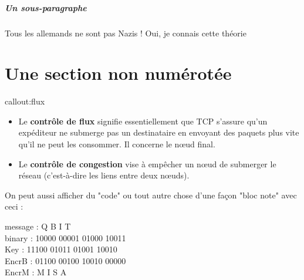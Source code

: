 \subparagraph{Un sous-paragraphe}

\begin{dialogue}
      Tous les allemands ne sont pas Nazis !
     Oui, je connais cette théorie
\end{dialogue}

\section*{Une section non numérotée}

\begin{callout}{callout:flux}
    \begin{itemize}
        \item Le \textbf{contrôle de flux} signifie essentiellement que TCP s'assure qu'un expéditeur ne submerge pas un destinataire en envoyant des paquets plus vite qu'il ne peut les consommer. Il concerne le nœud final.
        \item Le \textbf{contrôle de congestion} vise à empêcher un nœud de submerger le réseau (c'est-à-dire les liens entre deux nœuds).
    \end{itemize}
\end{callout}

On peut aussi afficher du "code" ou tout autre chose d'une façon "bloc note" avec ceci :
\begin{mycodebox}
    message :  Q     B     I     T \\
    binary : 10000 00001 01000 10011 \\
    Key :    11100 01011 01001 10010 \\
    EncrB :  01100 00100 10010 00000 \\
    EncrM :    M     I     S     A
\end{mycodebox}